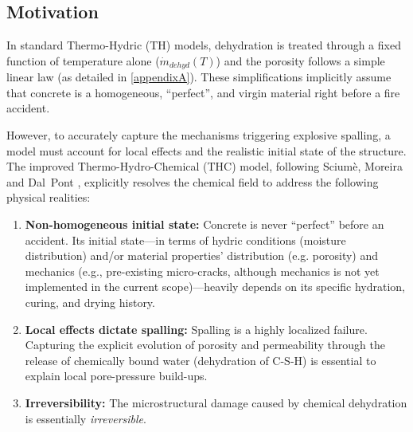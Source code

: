 \subsection{Motivation}

In standard Thermo-Hydric (TH) models, dehydration is treated through a fixed function of temperature alone ($\dot{m}_{dehyd}(T)$) and the porosity follows a simple linear law (as detailed in \cref{appendixA}). These simplifications implicitly assume that concrete is a homogeneous, ``perfect'', and virgin material right before a fire accident.

However, to accurately capture the mechanisms triggering explosive spalling, a model must account for local effects and the realistic initial state of the structure. The improved Thermo-Hydro-Chemical (THC) model, following Sciumè, Moreira and Dal~Pont \cite{sciume2024}, explicitly resolves the chemical field to address the following physical realities:
\begin{enumerate}
    \item \textbf{Non-homogeneous initial state:} Concrete is never ``perfect'' before an accident. Its initial state---in terms of hydric conditions (moisture distribution) and/or material properties’ distribution (e.g. porosity) and mechanics (e.g., pre-existing micro-cracks, although mechanics is not yet implemented in the current scope)---heavily depends on its specific hydration, curing, and drying history.
    \item \textbf{Local effects dictate spalling:} Spalling is a highly localized failure. Capturing the explicit evolution of porosity and permeability through the release of chemically bound water (dehydration of C-S-H) is essential to explain local pore-pressure build-ups.
    \item \textbf{Irreversibility:} The microstructural damage caused by chemical dehydration is essentially \emph{irreversible}.
\end{enumerate}

